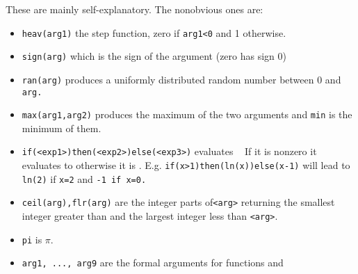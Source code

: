 These are mainly self-explanatory. The nonobvious ones are:
\begin{itemize}
\item {\tt heav(arg1)} the step function, zero if {\tt arg1<0} and 1 otherwise.
\item {\tt sign(arg)} which is the sign of the argument (zero has sign 0)
\item {\tt ran(arg)} produces a uniformly distributed random number
between 0 and {\tt arg.}
\item {\tt max(arg1,arg2)} produces the maximum of the two arguments
and {\tt min}  is 
the minimum of them.
\item {\tt if(<exp1>)then(<exp2>)else(<exp3>)} evaluates {\tt <exp1> }
If it is nonzero 
it evaluates to {\tt <exp2>} otherwise it is { \tt <exp3>}. 
 E.g. {\tt if(x>1)then(ln(x))else(x-1)}
will lead to {\tt ln(2)}  if {\tt x=2}  and { \tt -1 if x=0.}
\item {\tt  ceil(arg),flr(arg)}  are the integer parts of{\tt  <arg>} 
returning the
 smallest integer greater than and the largest integer less than {\tt <arg>}.  
\item {\tt  pi}  is $\pi.$ 
\item {\tt arg1, ..., arg9} are the formal arguments for functions and
\end{itemize}

